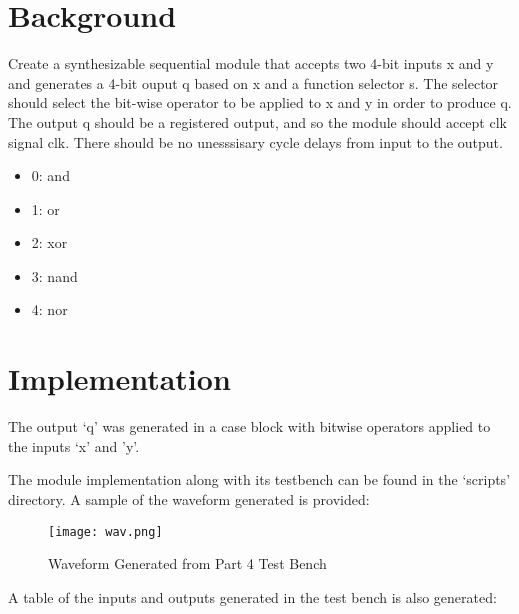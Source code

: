\documentclass[paper=usletter, fontsize=12pt]{article}
\begin{document}
    \vspace{-0.1in}

    \section{Background}
    Create a synthesizable sequential module that accepts two 4-bit inputs x and y and generates a 4-bit ouput q based on x and a function selector s. The selector should select the bit-wise operator to be applied to x and y in order to produce q. The output q should be a registered output, and so the module should accept clk signal clk. There should be no unesssisary cycle delays from input to the output.
    \begin{itemize}
        \item 0: and
        \item 1: or
        \item 2: xor
        \item 3: nand
        \item 4: nor
    \end{itemize}

    \section{Implementation}
    The output `q' was generated in a case block with bitwise operators applied to the inputs `x' and 'y'.

    The module implementation along with its testbench can be found in the `scripts' directory. A sample of the waveform generated is provided:

    \begin{figure}[ht]
        \begin{center}
            \texttt{[image: wav.png]}
            \caption{Waveform Generated from Part 4 Test Bench} \label{fig:wav}
        \end{center}
    \end{figure}

    A table of the inputs and outputs generated in the test bench is also generated:
\end{document}
